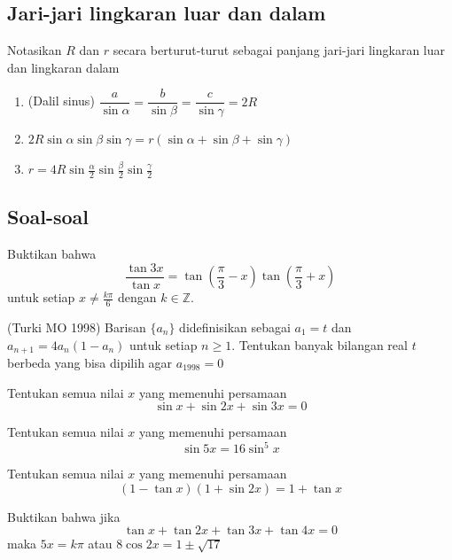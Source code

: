 \documentclass[11pt]{scrartcl}
\begin{document}
\subsection{Jari-jari lingkaran luar dan dalam}
Notasikan $R$ dan $r$ secara berturut-turut sebagai panjang jari-jari lingkaran luar dan lingkaran dalam
\begin{enumerate}
    \item (Dalil sinus) $\dfrac{a}{\sin{\alpha}} = \dfrac{b}{\sin{\beta}} = \dfrac{c}{\sin{\gamma}} = 2R$
    \item $2R\sin{\alpha}\sin{\beta}\sin{\gamma} = r(\sin{\alpha} + \sin{\beta} + \sin{\gamma})$
    \item $r = 4R\sin{\frac{\alpha}{2}}\sin{\frac{\beta}{2}}\sin{\frac{\gamma}{2}}$
\end{enumerate}

\subsection{Soal-soal}
\begin{problem}
    Buktikan bahwa \[\dfrac{\tan{3x}}{\tan{x}} = \tan{\left(\dfrac{\pi}{3} - x\right)}\tan{\left(\dfrac{\pi}{3} + x\right)}\] untuk setiap $x \neq \frac{k\pi}{6}$ dengan $k \in \mathbb{Z}$.
\end{problem}

\begin{problem}
    (Turki MO 1998) Barisan $\{a_n\}$ didefinisikan sebagai $a_1 = t$ dan $a_{n+ 1} = 4a_n(1 - a_n)$ untuk setiap $n \geq 1$. Tentukan banyak bilangan real $t$ berbeda yang bisa dipilih agar $a_{1998} = 0$
\end{problem}

\begin{problem}
    Tentukan semua nilai $x$ yang memenuhi persamaan \[\sin{x} + \sin{2x} + \sin{3x} = 0\]
\end{problem}

\begin{problem}
    Tentukan semua nilai $x$ yang memenuhi persamaan \[\sin{5x} = 16 \sin^5{x}\]
\end{problem}

\begin{problem}
    Tentukan semua nilai $x$ yang memenuhi persamaan \[(1 - \tan{x})(1 + \sin{2x}) = 1 + \tan{x}\]
\end{problem}

\begin{problem}
    Buktikan bahwa jika \[\tan{x} + \tan{2x} + \tan{3x} + \tan{4x} = 0\] maka $5x = k\pi$ atau $8 \cos{2x} = 1\pm \sqrt{17}$
\end{problem}
\end{document}
